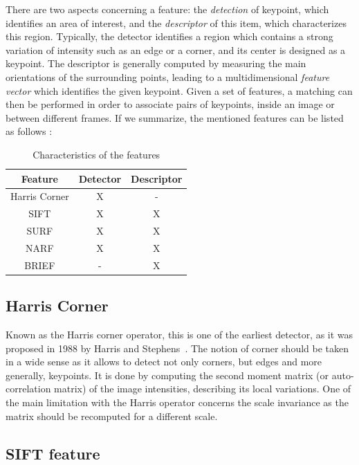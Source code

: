 There are two aspects concerning a feature: the \emph{detection} of keypoint, which identifies an area of interest, and the \emph{descriptor} of this item, which characterizes this region. Typically, the detector identifies a region which contains a strong variation of intensity such as an edge or a corner, and its center is designed as a keypoint. The descriptor is generally computed by measuring the main orientations of the surrounding points, leading to a multidimensional \emph{feature vector} which identifies the given keypoint. Given a set of features, a matching can then be performed in order to associate pairs of keypoints, inside an image or between different frames. If we summarize, the mentioned features can be listed as follows :

\begin {table}
 \begin{center}
  \begin{tabular}{c|cc}
  \hline
  Feature & Detector & Descriptor \\
  \hline
  Harris Corner & X & - \\
  SIFT & X & X \\
  SURF & X & X \\
  NARF & X & X \\
  BRIEF & - & X \\
  \hline
  \end{tabular}
 \end{center}
\caption {Characteristics of the features}
\end{table}

\subsection{Harris Corner}

Known as the Harris corner operator, this is one of the earliest detector, as it was proposed in 1988 by Harris and Stephens~\cite{Harris88alvey}. The  notion of corner should be taken in a wide sense as it allows to detect not only corners, but edges and more generally, keypoints. It is done by computing the second moment matrix (or auto-correlation matrix) of the image intensities, describing its local variations. One of the main limitation with the Harris operator concerns the scale invariance as the matrix should be recomputed for a different scale.

\subsection{SIFT feature}

